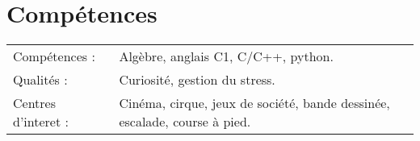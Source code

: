 \documentclass[a4paper,12pt]{article}
\begin{document}

\section{Compétences}
\begin{tabularx}{\linewidth}{@{}l X@{}}
Compétences : &  \normalsize{Algèbre, anglais C1, C/C++, python.}\\
Qualités : &  \normalsize{Curiosité, gestion du stress.}\\
Centres d'interet :  &  \normalsize{Cinéma, cirque, jeux de société, bande dessinée, escalade, course à pied.}\\  
\end{tabularx}

\vfill
{}
\end{document}
